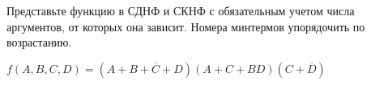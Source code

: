 \question Представьте функцию в СДНФ и СКНФ с обязательным учетом числа аргументов,
 от которых она зависит. Номера минтермов упорядочить по возрастанию.

$f(A,B,C,D) = (A + \overline{B+C+D})(A+C+BD)(C+\overline{D})$